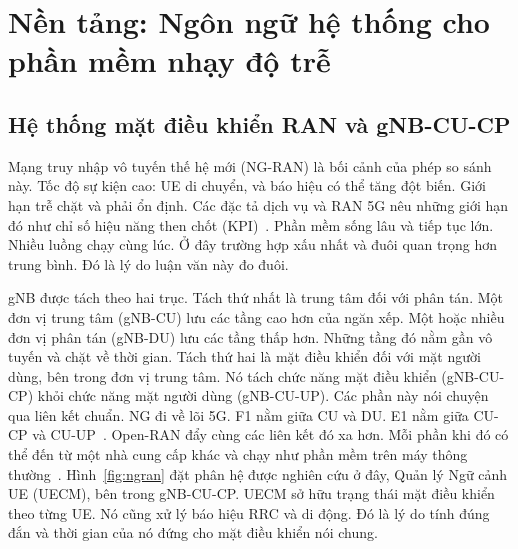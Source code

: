 \chapter{Nền tảng: Ngôn ngữ hệ thống cho phần mềm nhạy độ trễ\label{chapter:background}}

\section{Hệ thống mặt điều khiển RAN và gNB-CU-CP}\label{sec:ranarch}
Mạng truy nhập vô tuyến thế hệ mới (NG-RAN) là bối cảnh của phép so sánh này. Tốc độ sự kiện
cao: UE di chuyển, và báo hiệu có thể tăng đột biến. Giới hạn trễ chặt và phải ổn định. Các
đặc tả dịch vụ và RAN 5G nêu những giới hạn đó như chỉ số hiệu năng then chốt
(KPI)~\cite{3gpp38913,3gpp22261}. Phần mềm sống lâu và tiếp tục lớn. Nhiều luồng chạy cùng lúc.
Ở đây trường hợp xấu nhất và đuôi quan trọng hơn trung bình. Đó là lý do luận văn này đo đuôi.

gNB được tách theo hai trục. Tách thứ nhất là trung tâm đối với phân tán. Một đơn vị trung tâm
(gNB-CU) lưu các tầng cao hơn của ngăn xếp. Một hoặc nhiều đơn vị phân tán (gNB-DU) lưu các
tầng thấp hơn. Những tầng đó nằm gần vô tuyến và chặt về thời gian. Tách thứ hai là mặt điều
khiển đối với mặt người dùng, bên trong đơn vị trung tâm. Nó tách chức năng mặt điều khiển
(gNB-CU-CP) khỏi chức năng mặt người dùng (gNB-CU-UP). Các phần này nói chuyện qua liên kết
chuẩn. NG đi về lõi 5G. F1 nằm giữa CU và DU. E1 nằm giữa CU-CP và
CU-UP~\cite{3gpp38401,3gpp38300,3gpp38463}. Open-RAN đẩy cùng các liên kết đó xa hơn. Mỗi phần
khi đó có thể đến từ một nhà cung cấp khác và chạy như phần mềm trên máy thông
thường~\cite{polese2023oran}. Hình~\ref{fig:ngran} đặt phân hệ được nghiên cứu ở đây, Quản lý
Ngữ cảnh UE (UECM), bên trong gNB-CU-CP. UECM sở hữu trạng thái mặt điều khiển theo từng UE.
Nó cũng xử lý báo hiệu RRC và di động. Đó là lý do tính đúng đắn và thời gian của nó đứng cho
mặt điều khiển nói chung.

